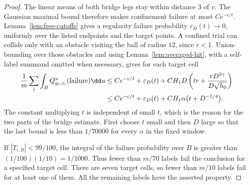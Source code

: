 \begin{proof}
The linear means of both bridge legs stay within distance $3$ of $v$.
The Gaussian maximal bound therefore makes confinement failure at
most $Ce^{-c/t}$.  Lemma~\ref{lem:free-cutoffs} gives a regularity
failure probability $\varepsilon_D(t)\to0$, uniformly over the listed
endpoints and the target points.  A confined trial can collide only
with an obstacle visiting the ball of radius $12$, since $r<1$.
Union-bounding over those obstacles and using
Lemma~\ref{lem:averaged-hit}, with a self-label summand
omitted when necessary, gives for each target cell
\begin{align}
 \frac1m\sum_i\int_B
 Q_{y_i,z_i}^{u}(\text{failure})\dd u
 &\le Ce^{-c/t}+\varepsilon_D(t)
       +CH_1D\left(tr+\frac{rD^{3\gamma}}{D\sqrt{h_0}}\right)
 \notag\\
 &\le Ce^{-c/t}+\varepsilon_D(t)
       +CH_1\alpha\bigl(t+D^{-1/4}\bigr).
 \label{bridge:total-failure}
\end{align}
The constant multiplying $t$ is independent of small $t$, which is
the reason for the two parts of the bridge estimate.  First choose
$t$ small and then $D$ large so that the last bound is less than
$1/70000$ for every $\alpha$ in the fixed window.

If $|T_{i,B}|<99/100$, the integral of the failure probability over
$B$ is greater than $(1/100)(1/10)=1/1000$.  Thus fewer than
$m/70$ labels fail the conclusion for a specified target cell.
There are seven target cells, so fewer than $m/10$ labels fail for
at least one of them.  All the remaining labels have the asserted
property.
\end{proof}

